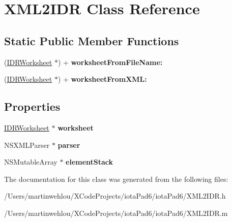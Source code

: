 \hypertarget{interface_x_m_l2_i_d_r}{
\section{XML2IDR Class Reference}
\label{interface_x_m_l2_i_d_r}
}
\subsection*{Static Public Member Functions}
\begin{DoxyCompactItemize}
\item 
\hypertarget{interface_x_m_l2_i_d_r_a34771f75c3f1ab64242362a06719d31e}{
(\hyperlink{interface_i_d_r_worksheet}{IDRWorksheet} $\ast$) + {\bfseries worksheetFromFileName:}}
\label{interface_x_m_l2_i_d_r_a34771f75c3f1ab64242362a06719d31e}

\item 
\hypertarget{interface_x_m_l2_i_d_r_ad9203f68170c883a09606fb81f485442}{
(\hyperlink{interface_i_d_r_worksheet}{IDRWorksheet} $\ast$) + {\bfseries worksheetFromXML:}}
\label{interface_x_m_l2_i_d_r_ad9203f68170c883a09606fb81f485442}

\end{DoxyCompactItemize}
\subsection*{Properties}
\begin{DoxyCompactItemize}
\item 
\hypertarget{interface_x_m_l2_i_d_r_a51aee55c6dd297820d174dc47718d0ea}{
\hyperlink{interface_i_d_r_worksheet}{IDRWorksheet} $\ast$ {\bfseries worksheet}}
\label{interface_x_m_l2_i_d_r_a51aee55c6dd297820d174dc47718d0ea}

\item 
\hypertarget{interface_x_m_l2_i_d_r_ae46bb2c1a6d67cf500f3435ecd6a6156}{
NSXMLParser $\ast$ {\bfseries parser}}
\label{interface_x_m_l2_i_d_r_ae46bb2c1a6d67cf500f3435ecd6a6156}

\item 
\hypertarget{interface_x_m_l2_i_d_r_a74acce62ecde441a467301e47397c15a}{
NSMutableArray $\ast$ {\bfseries elementStack}}
\label{interface_x_m_l2_i_d_r_a74acce62ecde441a467301e47397c15a}

\end{DoxyCompactItemize}


The documentation for this class was generated from the following files:\begin{DoxyCompactItemize}
\item 
/Users/martinwehlou/XCodeProjects/iotaPad6/iotaPad6/XML2IDR.h\item 
/Users/martinwehlou/XCodeProjects/iotaPad6/iotaPad6/XML2IDR.m\end{DoxyCompactItemize}

